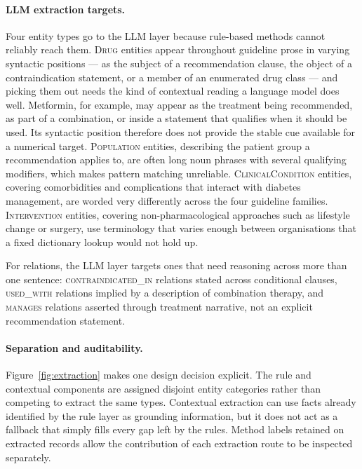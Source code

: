 \paragraph{LLM extraction targets.}
Four entity types go to the LLM layer because rule-based methods cannot reliably reach them. \textsc{Drug} entities appear throughout guideline prose in varying syntactic positions --- as the subject of a recommendation clause, the object of a contraindication statement, or a member of an enumerated drug class --- and picking them out needs the kind of contextual reading a language model does well. Metformin, for example, may appear as the treatment
being recommended, as part of a combination, or inside a statement that
qualifies when it should be used. Its syntactic position therefore does
not provide the stable cue available for a numerical target.
\textsc{Population} entities, describing the patient group a recommendation applies to, are often long noun phrases with several qualifying modifiers, which makes pattern matching unreliable. \textsc{ClinicalCondition} entities, covering comorbidities and complications that interact with diabetes management, are worded very differently across the four guideline families. \textsc{Intervention} entities, covering non-pharmacological approaches such as lifestyle change or surgery, use terminology that varies enough between organisations that a fixed dictionary lookup would not hold up.

For relations, the LLM layer targets ones that need reasoning across more than one sentence: \textsc{contraindicated\_in} relations stated across conditional clauses, \textsc{used\_with} relations implied by a description of combination therapy, and \textsc{manages} relations asserted through treatment narrative, not an explicit recommendation statement.

\paragraph{Separation and auditability.}
Figure~\ref{fig:extraction} makes one design decision explicit. The rule and contextual components are assigned disjoint entity categories rather than competing to extract the same types. Contextual extraction can use facts already identified by the rule layer as grounding information, but it does not act as a fallback that simply fills every gap left by the rules. Method labels retained on extracted records allow the contribution of each extraction route to be inspected separately.

